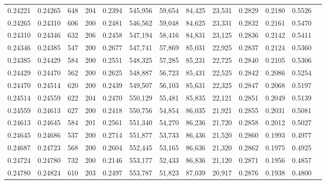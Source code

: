 \begin{tabular}{rrrrrrrrrrrrr}
0.24221 & 0.24265 &   648 & 204 &                                     0.2394 & 545,956 &  59,654 &  84,425 &  23,531 & 0.2829 & 0.2180 & 0.5526 \\
0.24265 & 0.24310 &   606 & 200 &                                     0.2481 & 546,562 &  59,048 &  84,625 &  23,331 & 0.2832 & 0.2161 & 0.5470 \\
0.24310 & 0.24346 &   632 & 206 &                                     0.2458 & 547,194 &  58,416 &  84,831 &  23,125 & 0.2836 & 0.2142 & 0.5411 \\
0.24346 & 0.24385 &   547 & 200 &                                     0.2677 & 547,741 &  57,869 &  85,031 &  22,925 & 0.2837 & 0.2124 & 0.5360 \\
0.24385 & 0.24429 &   584 & 200 &                                     0.2551 & 548,325 &  57,285 &  85,231 &  22,725 & 0.2840 & 0.2105 & 0.5306 \\
0.24429 & 0.24470 &   562 & 200 &                                     0.2625 & 548,887 &  56,723 &  85,431 &  22,525 & 0.2842 & 0.2086 & 0.5254 \\
0.24470 & 0.24514 &   620 & 200 &                                     0.2439 & 549,507 &  56,103 &  85,631 &  22,325 & 0.2847 & 0.2068 & 0.5197 \\
0.24514 & 0.24559 &   622 & 204 &                                     0.2470 & 550,129 &  55,481 &  85,835 &  22,121 & 0.2851 & 0.2049 & 0.5139 \\
0.24559 & 0.24613 &   627 & 200 &                                     0.2418 & 550,756 &  54,854 &  86,035 &  21,921 & 0.2855 & 0.2031 & 0.5081 \\
0.24613 & 0.24645 &   584 & 201 &                                     0.2561 & 551,340 &  54,270 &  86,236 &  21,720 & 0.2858 & 0.2012 & 0.5027 \\
0.24645 & 0.24686 &   537 & 200 &                                     0.2714 & 551,877 &  53,733 &  86,436 &  21,520 & 0.2860 & 0.1993 & 0.4977 \\
0.24687 & 0.24723 &   568 & 200 &                                     0.2604 & 552,445 &  53,165 &  86,636 &  21,320 & 0.2862 & 0.1975 & 0.4925 \\
0.24724 & 0.24780 &   732 & 200 &                                     0.2146 & 553,177 &  52,433 &  86,836 &  21,120 & 0.2871 & 0.1956 & 0.4857 \\
0.24780 & 0.24824 &   610 & 203 &                                     0.2497 & 553,787 &  51,823 &  87,039 &  20,917 & 0.2876 & 0.1938 & 0.4800 \\

\end{tabular}
